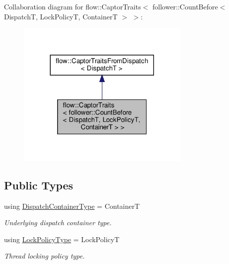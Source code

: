Collaboration diagram for flow\+:\+:Captor\+Traits$<$ follower\+:\+:Count\+Before$<$ DispatchT, Lock\+PolicyT, ContainerT $>$ $>$\+:
\nopagebreak
\begin{figure}[H]
\begin{center}
\leavevmode
\includegraphics[width=236pt]{structflow_1_1_captor_traits_3_01follower_1_1_count_before_3_01_dispatch_t_00_01_lock_policy_t_0921e31be6500fb23386855a994fc7ec9}
\end{center}
\end{figure}
\subsection*{Public Types}
\begin{DoxyCompactItemize}
\item 
\mbox{\label{structflow_1_1_captor_traits_3_01follower_1_1_count_before_3_01_dispatch_t_00_01_lock_policy_t_00_01_container_t_01_4_01_4_a10a4df96151647bd0f5570a35505894d}} 
using \hyperlink{structflow_1_1_captor_traits_3_01follower_1_1_count_before_3_01_dispatch_t_00_01_lock_policy_t_00_01_container_t_01_4_01_4_a10a4df96151647bd0f5570a35505894d}{Dispatch\+Container\+Type} = ContainerT
\begin{DoxyCompactList}\small\item\em Underlying dispatch container type. \end{DoxyCompactList}\item 
\mbox{\label{structflow_1_1_captor_traits_3_01follower_1_1_count_before_3_01_dispatch_t_00_01_lock_policy_t_00_01_container_t_01_4_01_4_a45fdf2fbf86dba54ad249029bd66886c}} 
using \hyperlink{structflow_1_1_captor_traits_3_01follower_1_1_count_before_3_01_dispatch_t_00_01_lock_policy_t_00_01_container_t_01_4_01_4_a45fdf2fbf86dba54ad249029bd66886c}{Lock\+Policy\+Type} = Lock\+PolicyT
\begin{DoxyCompactList}\small\item\em Thread locking policy type. \end{DoxyCompactList}\end{DoxyCompactItemize}


